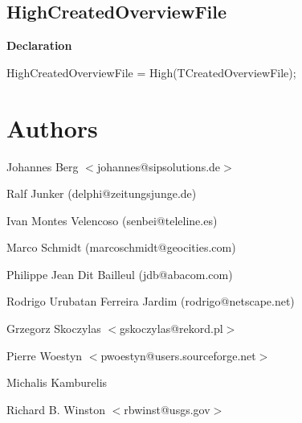 \documentclass{report}
\newif\ifpdf
\begin{document}
\subsection*{HighCreatedOverviewFile}
\fi
\label{PasDoc_Gen-HighCreatedOverviewFile}
\begin{list}{}{
\setlength{\itemindent}{0cm}
\setlength{\listparindent}{0cm}
\setlength{\leftmargin}{\evensidemargin}
\addtolength{\leftmargin}{\tmplength}
\settowidth{\labelsep}{X}
\addtolength{\leftmargin}{\labelsep}
\setlength{\labelwidth}{\tmplength}
}
\item[\textbf{Declaration}\hfill]
\ifpdf
\begin{flushleft}
\fi
\begin{ttfamily}
HighCreatedOverviewFile = High(TCreatedOverviewFile);\end{ttfamily}

\ifpdf
\end{flushleft}
\fi

\end{list}
\section{Authors}
\par
Johannes Berg {$<$}johannes@sipsolutions.de{$>$}

\par
Ralf Junker (delphi@zeitungsjunge.de)

\par
Ivan Montes Velencoso (senbei@teleline.es)

\par
Marco Schmidt (marcoschmidt@geocities.com)

\par
Philippe Jean Dit Bailleul (jdb@abacom.com)

\par
Rodrigo Urubatan Ferreira Jardim (rodrigo@netscape.net)

\par
Grzegorz Skoczylas {$<$}gskoczylas@rekord.pl{$>$}

\par
Pierre Woestyn {$<$}pwoestyn@users.sourceforge.net{$>$}

\par
Michalis Kamburelis

\par
Richard B. Winston {$<$}rbwinst@usgs.gov{$>$}
\end{document}
